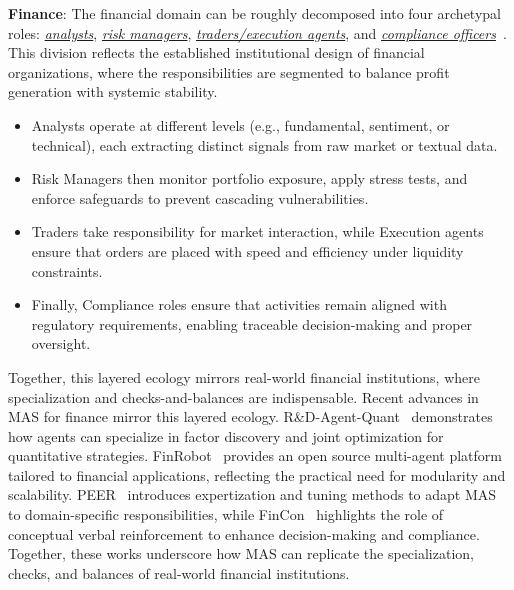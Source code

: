 \noindent \textbf{Finance}: 
The financial domain can be roughly decomposed into four archetypal roles: \underline{\emph{analysts}}, \underline{\emph{risk managers}}, \underline{\emph{traders/execution agents}}, and \underline{\emph{compliance officers}}~\cite{Chen2012, Hull2018}. This division reflects the established institutional design of financial organizations, where the responsibilities are segmented to balance profit generation with systemic stability.
\begin{itemize}
    \item Analysts operate at different levels (e.g., fundamental, sentiment, or technical), each extracting distinct signals from raw market or textual data.
    \item Risk Managers then monitor portfolio exposure, apply stress tests, and enforce safeguards to prevent cascading vulnerabilities. 
    \item Traders take responsibility for market interaction, while Execution agents ensure that orders are placed with speed and efficiency under liquidity constraints.
    \item Finally, Compliance roles ensure that activities remain aligned with regulatory requirements, enabling traceable decision-making and proper oversight.
\end{itemize}
Together, this layered ecology mirrors real-world financial institutions, where specialization and checks-and-balances are indispensable.
Recent advances in MAS for finance mirror this layered ecology. R\&D-Agent-Quant~\cite{R&D-Agent-Quant} demonstrates how agents can specialize in factor discovery and joint optimization for quantitative strategies. FinRobot~\cite{yang2024finrobot} provides an open source multi-agent platform tailored to financial applications, reflecting the practical need for modularity and scalability. PEER~\cite{wang2024peer} introduces expertization and tuning methods to adapt MAS to domain-specific responsibilities, while FinCon~\cite{finconf} highlights the role of conceptual verbal reinforcement to enhance decision-making and compliance. Together, these works underscore how MAS can replicate the specialization, checks, and balances of real-world financial institutions.



